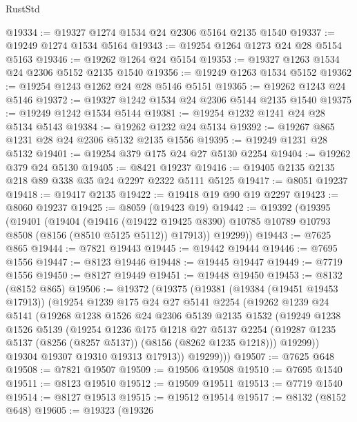 \begin{lexlean}{RustStd}
\begin{coremodule}
@19334 := @19327 @1274 @1534 @24 @2306 @5164 @2135 @1540
@19337 := @19249 @1274 @1534 @5164
@19343 := @19254 @1264 @1273 @24 @28 @5154 @5163
@19346 := @19262 @1264 @24 @5154
@19353 := @19327 @1263 @1534 @24 @2306 @5152 @2135 @1540
@19356 := @19249 @1263 @1534 @5152
@19362 := @19254 @1243 @1262 @24 @28 @5146 @5151
@19365 := @19262 @1243 @24 @5146
@19372 := @19327 @1242 @1534 @24 @2306 @5144 @2135 @1540
@19375 := @19249 @1242 @1534 @5144
@19381 := @19254 @1232 @1241 @24 @28 @5134 @5143
@19384 := @19262 @1232 @24 @5134
@19392 := @19267 @865 @1231 @28 @24 @2306 @5132 @2135 @1556
@19395 := @19249 @1231 @28 @5132
@19401 := @19254 @379 @175 @24 @27 @5130 @2254
@19404 := @19262 @379 @24 @5130
@19405 := @8421 @19237
@19416 := @19405 @2135 @2135 @218 @89 @338 @35 @24 @2297 @2322 @5111 @5125
@19417 := @8051 @19237
@19418 := @19417 @2135
@19422 := @19418 @19 @90 @19 @2297
@19423 := @8060 @19237
@19425 := @8059 (@19423 @19)
@19442 := @19392
    (@19395
      (@19401
        (@19404
          (@19416
            (@19422 @19425 @8390)
            @10785
            @10789
            @10793
            @8508
            (@8156 (@8510 @5125 @5112))
            @17913))
        @19299))
@19443 := @7625 @865
@19444 := @7821 @19443
@19445 := @19442 @19444
@19446 := @7695 @1556
@19447 := @8123 @19446
@19448 := @19445 @19447
@19449 := @7719 @1556
@19450 := @8127 @19449
@19451 := @19448 @19450
@19453 := @8132 (@8152 @865)
@19506 := @19372
    (@19375
      (@19381
        (@19384 (@19451 @19453 @17913))
        (@19254
          @1239
          @175
          @24
          @27
          @5141
          @2254
          (@19262
            @1239
            @24
            @5141
            (@19268
              @1238
              @1526
              @24
              @2306
              @5139
              @2135
              @1532
              (@19249
                @1238
                @1526
                @5139
                (@19254
                  @1236
                  @175
                  @1218
                  @27
                  @5137
                  @2254
                  (@19287 @1235 @5137 (@8256 (@8257 @5137)) (@8156 (@8262 @1235 @1218)))
                  @19299))
              @19304
              @19307
              @19310
              @19313
              @17913))
          @19299)))
@19507 := @7625 @648
@19508 := @7821 @19507
@19509 := @19506 @19508
@19510 := @7695 @1540
@19511 := @8123 @19510
@19512 := @19509 @19511
@19513 := @7719 @1540
@19514 := @8127 @19513
@19515 := @19512 @19514
@19517 := @8132 (@8152 @648)
@19605 := @19323
    (@19326

\end{coremodule}
\end{lexlean}
